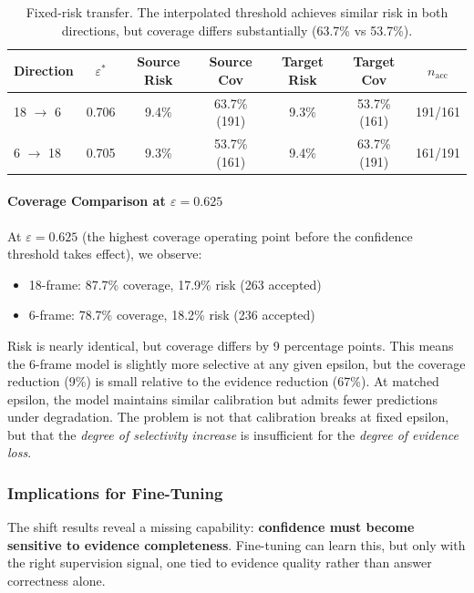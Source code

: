 \documentclass{article}
\begin{document}
\begin{table}[h]
\centering
\small
\begin{tabular}{lcccccc}
\toprule
Direction & $\varepsilon^*$ & Source Risk & Source Cov & Target Risk & Target Cov & $n_{\text{acc}}$ \\
\midrule
18 $\to$ 6 & 0.706 & 9.4\% & 63.7\% (191) & 9.3\% & 53.7\% (161) & 191/161 \\
6 $\to$ 18 & 0.705 & 9.3\% & 53.7\% (161) & 9.4\% & 63.7\% (191) & 161/191 \\
\bottomrule
\end{tabular}
\caption{Fixed-risk transfer. The interpolated threshold achieves similar risk in both directions, but coverage differs substantially (63.7\% vs 53.7\%).}
\end{table}

\paragraph{Coverage Comparison at $\varepsilon=0.625$}

At $\varepsilon=0.625$ (the highest coverage operating point before the confidence threshold takes effect), we observe:
\begin{itemize}
    \item 18-frame: 87.7\% coverage, 17.9\% risk (263 accepted)
    \item 6-frame: 78.7\% coverage, 18.2\% risk (236 accepted)
\end{itemize}
Risk is nearly identical, but coverage differs by 9 percentage points. This means the 6-frame model is slightly more selective at any given epsilon, but the coverage reduction (9\%) is small relative to the evidence reduction (67\%). At matched epsilon, the model maintains similar calibration but admits fewer predictions under degradation. The problem is not that calibration breaks at fixed epsilon, but that the \emph{degree of selectivity increase} is insufficient for the \emph{degree of evidence loss}.

\subsubsection{Implications for Fine-Tuning}

The shift results reveal a missing capability: \textbf{confidence must become sensitive to evidence completeness}. Fine-tuning can learn this, but only with the right supervision signal, one tied to evidence quality rather than answer correctness alone.
\end{document}

